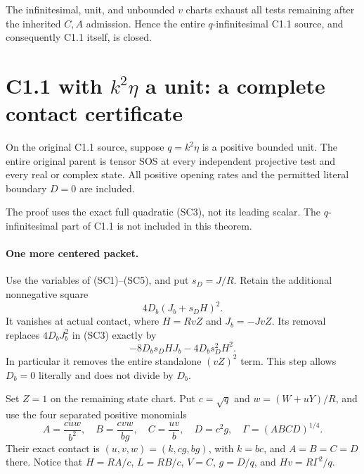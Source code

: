The infinitesimal, unit, and unbounded $v$ charts exhaust all tests
remaining after the inherited $C,A$ admission. Hence the entire
$q$-infinitesimal C1.1 source, and consequently C1.1 itself, is closed.


\section{\texorpdfstring{C1.1 with $k^2\eta$ a unit: a complete contact certificate}{C1.1 with k2eta a unit: a complete contact certificate}}
\label{component:p95350f69a353}

\label{p95350f69a353:sec:r7-c1-q-unit}
\begin{theorem}
On the original C1.1 source, suppose $q=k^2\eta$ is a positive bounded
unit. The entire original parent is tensor SOS at every independent
projective test and every real or complex state. All positive opening
rates and the permitted literal boundary $D=0$ are included.
\end{theorem}
The proof uses the exact full quadratic (SC3), not its leading scalar.
The $q$-infinitesimal part of C1.1 is not included in this theorem.

\paragraph{One more centered packet.}
Use the variables of (SC1)--(SC5), and put $s_D=J/R$. Retain the
additional nonnegative square
\[
                  4D_b(J_b+s_DH)^2.                 \tag{SC10}
\]
It vanishes at actual contact, where $H=RvZ$ and $J_b=-JvZ$.
Its removal replaces $4D_bJ_b^2$ in (SC3) exactly by
\[
                  -8D_bs_DHJ_b-4D_bs_D^2H^2.
\]
In particular it removes the entire standalone $(vZ)^2$ term.
This step allows $D_b=0$ literally and does not divide by $D_b$.

Set $Z=1$ on the remaining state chart. Put $c=\sqrt q$ and
$w=(W+uY)/R$, and use the four separated positive monomials
\[
 A=\frac{cuw}{b^2},\quad B=\frac{cvw}{bg},\quad
 C=\frac{uv}{b},\quad D=c^2g,\quad
 \Gamma=(ABCD)^{1/4}.
 \tag{SC11}
\]
Their exact contact is $(u,v,w)=(k,cg,bg)$, with $k=bc$, and
$A=B=C=D$ there. Notice that $H=RA/c$, $L=RB/c$, $V=C$,
$g=D/q$, and $Hv=R\Gamma^2/q$.

